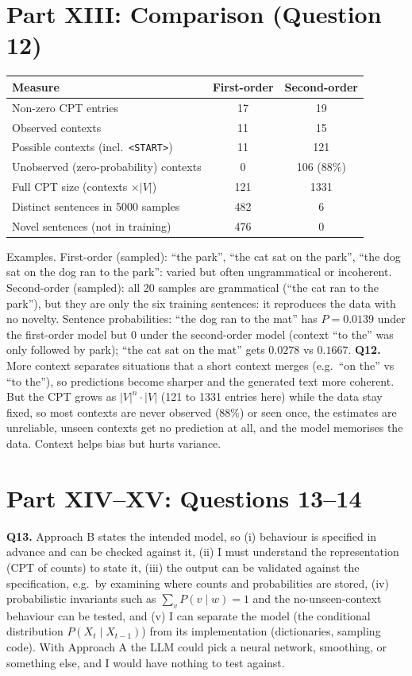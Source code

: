 \documentclass[10pt,a4paper]{article}
\begin{document}
\section*{Part XIII: Comparison (Question 12)}
\begin{center}\begin{tabular}{lcc}\toprule Measure & First-order & Second-order\\\midrule
Non-zero CPT entries & 17 & 19\\
Observed contexts & 11 & 15\\
Possible contexts (incl.\ \texttt{<START>}) & 11 & 121\\
Unobserved (zero-probability) contexts & 0 & 106 (88\%)\\
Full CPT size (contexts $\times|V|$) & 121 & 1331\\
Distinct sentences in 5000 samples & 482 & 6\\
Novel sentences (not in training) & 476 & 0\\\bottomrule\end{tabular}\end{center}
Examples. First-order (sampled): ``the park'', ``the cat sat on the park'', ``the dog sat on the dog ran to the park'': varied but often ungrammatical or incoherent. Second-order (sampled): all 20 samples are grammatical (``the cat ran to the park''), but they are only the six training sentences: it reproduces the data with no novelty. Sentence probabilities: ``the dog ran to the mat'' has $P=0.0139$ under the first-order model but $0$ under the second-order model (context ``to the'' was only followed by park); ``the cat sat on the mat'' gets $0.0278$ vs $0.1667$.
\textbf{Q12.} More context separates situations that a short context merges (e.g.\ ``on the'' vs ``to the''), so predictions become sharper and the generated text more coherent. But the CPT grows as $|V|^{n}\cdot|V|$ (121 to 1331 entries here) while the data stay fixed, so most contexts are never observed (88\%) or seen once, the estimates are unreliable, unseen contexts get no prediction at all, and the model memorises the data. Context helps bias but hurts variance.

\section*{Part XIV--XV: Questions 13--14}
\textbf{Q13.} Approach B states the intended model, so (i) behaviour is specified in advance and can be checked against it, (ii) I must understand the representation (CPT of counts) to state it, (iii) the output can be validated against the specification, e.g.\ by examining where counts and probabilities are stored, (iv) probabilistic invariants such as $\sum_vP(v\mid w)=1$ and the no-unseen-context behaviour can be tested, and (v) I can separate the model (the conditional distribution $P(X_t\mid X_{t-1})$) from its implementation (dictionaries, sampling code). With Approach A the LLM could pick a neural network, smoothing, or something else, and I would have nothing to test against.
\end{document}
